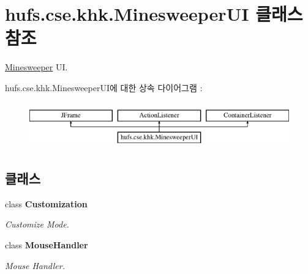\hypertarget{classhufs_1_1cse_1_1khk_1_1_minesweeper_u_i}{}\section{hufs.\+cse.\+khk.\+Minesweeper\+UI 클래스 참조}
\label{classhufs_1_1cse_1_1khk_1_1_minesweeper_u_i}


\hyperlink{classhufs_1_1cse_1_1khk_1_1_minesweeper}{Minesweeper} UI.  


hufs.\+cse.\+khk.\+Minesweeper\+U\+I에 대한 상속 다이어그램 \+: \begin{figure}[H]
\begin{center}
\leavevmode
\includegraphics[height=2.000000cm]{classhufs_1_1cse_1_1khk_1_1_minesweeper_u_i}
\end{center}
\end{figure}
\subsection*{클래스}
\begin{DoxyCompactItemize}
\item 
class {\bfseries Customization}
\begin{DoxyCompactList}\small\item\em Customize Mode. \end{DoxyCompactList}\item 
class {\bfseries Mouse\+Handler}
\begin{DoxyCompactList}\small\item\em Mouse Handler. \end{DoxyCompactList}\end{DoxyCompactItemize}

